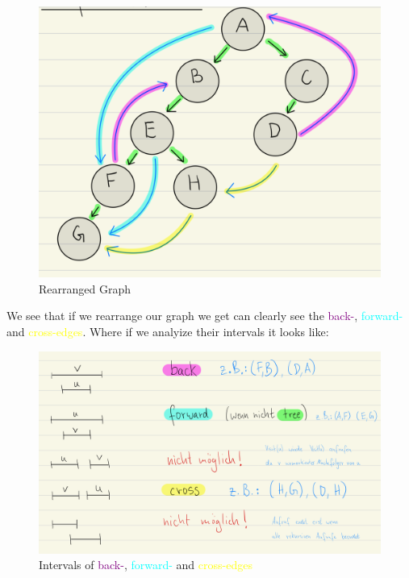 \documentclass[a4paper]{article}
\begin{document}
\begin{figure}[h]
    \centering
    \includegraphics[scale = 0.35]{Pictures/PrePostIntrvalOrdered.png}
    \caption{Rearranged Graph}
    \label{fig:BackCrossForwardEdges}
\end{figure}
We see that if we rearrange our graph we get can clearly see the \textcolor{purple}{back-}, \textcolor{cyan}{forward-} and \textcolor{yellow}{cross-edges}. Where if we analyize their intervals it looks like: 

\begin{figure}[h]
    \centering
    \includegraphics[scale = 0.3]{Pictures/PrePostIntrvalOrderedIn.png}
    \caption{Intervals of \textcolor{purple}{back-}, \textcolor{cyan}{forward-} and \textcolor{yellow}{cross-edges} }
    \label{fig:IntervalsofCrossEdges}
\end{figure}
\end{document}
